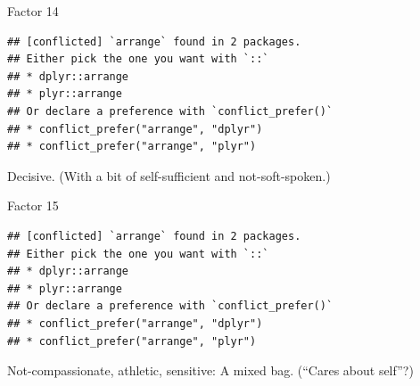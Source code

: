 \documentclass[ignorenonframetext,]{beamer}
\newenvironment{Shaded}{\begin{snugshade}}{\end{snugshade}}
\newcommand{\DecValTok}[1]{\textcolor[rgb]{0.00,0.00,0.81}{#1}}
\newcommand{\KeywordTok}[1]{\textcolor[rgb]{0.13,0.29,0.53}{\textbf{#1}}}
\newcommand{\NormalTok}[1]{#1}
\newcommand{\OperatorTok}[1]{\textcolor[rgb]{0.81,0.36,0.00}{\textbf{#1}}}
\newcommand{\StringTok}[1]{\textcolor[rgb]{0.31,0.60,0.02}{#1}}
\begin{document}
\begin{frame}[fragile]{Factor 14}
\protect\hypertarget{factor-14}{}

\begin{Shaded}
\end{Shaded}

\begin{verbatim}
## [conflicted] `arrange` found in 2 packages.
## Either pick the one you want with `::` 
## * dplyr::arrange
## * plyr::arrange
## Or declare a preference with `conflict_prefer()`
## * conflict_prefer("arrange", "dplyr")
## * conflict_prefer("arrange", "plyr")
\end{verbatim}

Decisive. (With a bit of self-sufficient and not-soft-spoken.)

\end{frame}

\begin{frame}[fragile]{Factor 15}
\protect\hypertarget{factor-15}{}

\begin{Shaded}
\end{Shaded}

\begin{verbatim}
## [conflicted] `arrange` found in 2 packages.
## Either pick the one you want with `::` 
## * dplyr::arrange
## * plyr::arrange
## Or declare a preference with `conflict_prefer()`
## * conflict_prefer("arrange", "dplyr")
## * conflict_prefer("arrange", "plyr")
\end{verbatim}

Not-compassionate, athletic, sensitive: A mixed bag. (``Cares about
self''?)

\end{frame}
\end{document}
